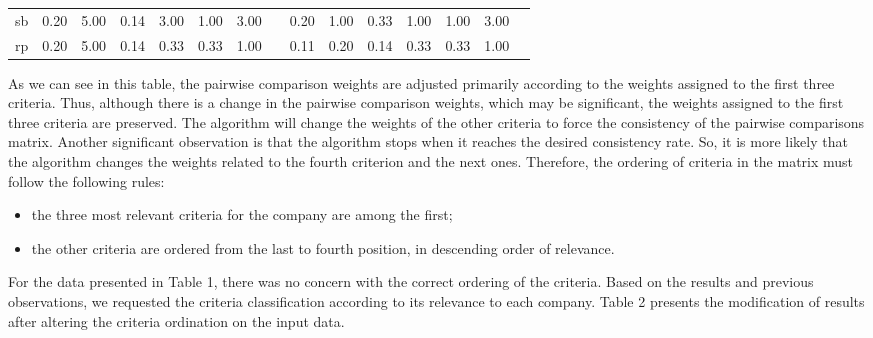 \documentclass[10pt,fleqn,a4paper,twoside]{article}
\begin{document}
\begin{table}[ht]
\begin{center}
\begin{tabular}[l]{p{0.4cm} p{0.5cm} p{0.5cm} p{0.5cm} p{0.5cm} p{0.5cm} p{0.5cm} p{0.5cm} | p{0.5cm} p{0.5cm} p{0.5cm} p{0.5cm} p{0.5cm} p{0.5cm} p{0.5cm}}
						sb & 0.20 & \cellcolor[HTML]{ACE600} 5.00 & \cellcolor[HTML]{ACE600} 0.14 & \cellcolor[HTML]{ACE600} 3.00 & 1.00 & 3.00 & & 0.20 & \cellcolor[HTML]{ACE600} 1.00 & \cellcolor[HTML]{ACE600} 0.33 & \cellcolor[HTML]{ACE600} 1.00 & 1.00 & 3.00 \\
						rp & \cellcolor[HTML]{ACE600} 0.20 & \cellcolor[HTML]{ACE600} 5.00 & 0.14 & 0.33 & 0.33 & 1.00 & & \cellcolor[HTML]{ACE600} 0.11 & \cellcolor[HTML]{ACE600} 0.20 & 0.14 & 0.33 & 0.33 & 1.00
				\end{tabular} \label{tab:pairwiseMatrix}
            \end{center}
	\end{table}

As we can see in this table, the pairwise comparison weights are adjusted primarily according to the weights assigned to the first three criteria. Thus, although there is a change in the pairwise comparison weights, which may be significant, the weights assigned to the first three criteria are preserved. The algorithm will change the weights of the other criteria to force the consistency of the pairwise comparisons matrix. Another significant observation is that the algorithm stops when it reaches the desired consistency rate. So, it is more likely that the algorithm changes the weights related to the fourth criterion and the next ones. Therefore, the ordering of criteria in the matrix must follow the following rules:

\begin{itemize}
\item the three most relevant criteria for the company are among the first;
\item the other criteria are ordered from the last to fourth position, in descending order of relevance.
\end{itemize}

For the data presented in Table 1, there was no concern with the correct ordering of the criteria. Based on the results and previous observations,  we requested the criteria classification according to its relevance to each company. Table 2 presents the modification of results after altering the criteria ordination on the input data.
\end{document}
